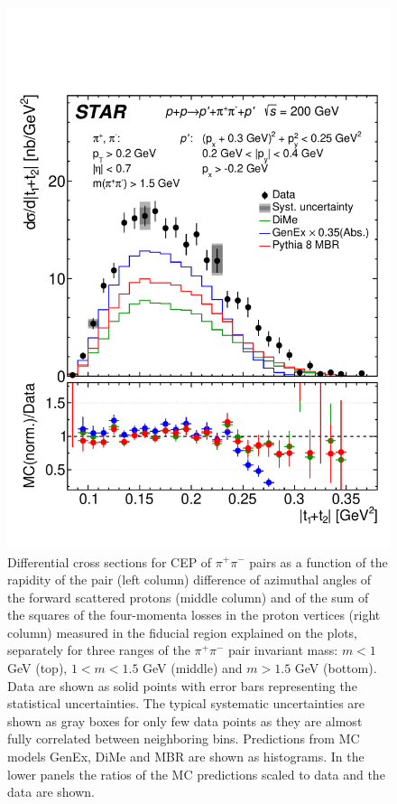 \begin{figure}[t]
\hfill
\includegraphics[width=.31\textwidth,page=1]{graphics/physicsResults/Ratio_FinalResult_MandelstamTSum_pion_MassBin_3.pdf}
%
\caption{Differential cross sections for CEP of $\pi^+\pi^-$ pairs as a function of the rapidity of the pair (left column) difference of azimuthal angles of the forward scattered protons (middle column) and of the sum of the squares of the four-momenta losses in the proton vertices (right column) measured in the fiducial region explained on the plots, separately for three ranges of the $\pi^+\pi^-$ pair invariant mass: $m<1$ GeV (top), $1<m<1.5$ GeV (middle) and $m>1.5$ GeV (bottom). Data are shown as solid points with error bars representing the statistical uncertainties. The typical systematic uncertainties are shown as gray boxes for only few data points as they are almost fully correlated between neighboring bins. Predictions from MC models GenEx, DiMe and MBR are shown as histograms. In the lower panels the ratios of the MC predictions scaled to data and the data are shown.}
\label{results_4}
\end{figure}
%
%

